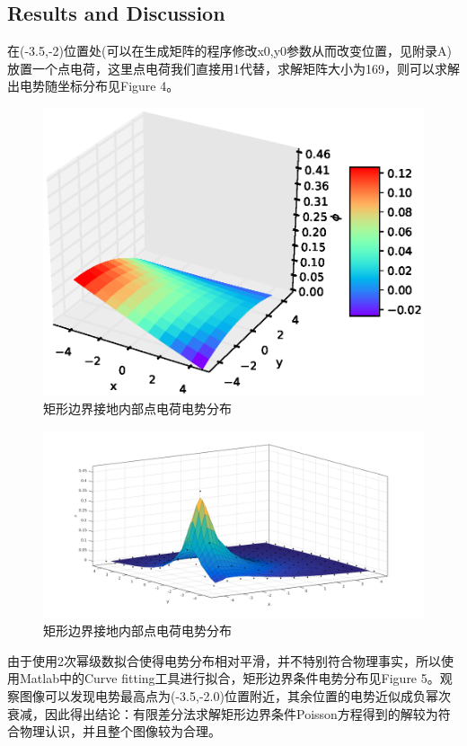 \documentclass[twoside,twocolumn]{article}
\begin{document}
\begin{CJK*}{UTF8}{gkai}
\section{Results and Discussion}
	在(-3.5,-2)位置处(可以在生成矩阵的程序修改x0,y0参数从而改变位置，见附录A)放置一个点电荷，这里点电荷我们直接用1代替，求解矩阵大小为169，则可以求解出电势随坐标分布见Figure 4。
	\begin{figure}[h]
	\centering
	\includegraphics[width=1.0\linewidth]{figure/figureR}
	\caption{矩形边界接地内部点电荷电势分布}
	\label{fig:figureR}
	\end{figure}
	\begin{figure}[h]
		\centering
		\includegraphics[width=1.0\linewidth]{figure/figure5}
		\caption{矩形边界接地内部点电荷电势分布}
		\label{fig:figure5}
	\end{figure}
		

	由于使用2次幂级数拟合使得电势分布相对平滑，并不特别符合物理事实，所以使用Matlab中的Curve fitting工具进行拟合，矩形边界条件电势分布见Figure 5。观察图像可以发现电势最高点为(-3.5,-2.0)位置附近，其余位置的电势近似成负幂次衰减，因此得出结论：有限差分法求解矩形边界条件Poisson方程得到的解较为符合物理认识，并且整个图像较为合理。
	

\end{CJK*}
\end{document}
